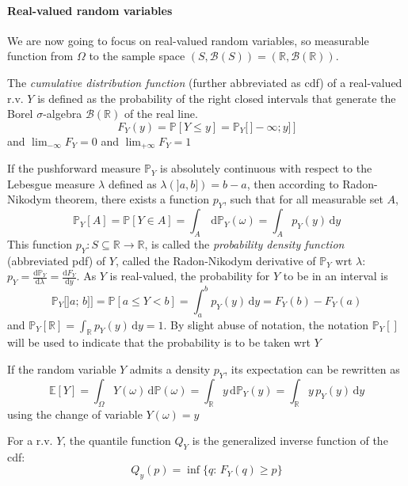 \documentclass[a4paper,11pt]{article}
\newcommand{\Ex}{\mathbb{E}}
\newcommand{\Prob}{\mathbb{P}}
\theoremstyle{defi}
\numberwithin{thmCounter}{section}
\begin{document}
\paragraph{Real-valued random variables}
We are now going to focus on real-valued random variables, so measurable function from $\Omega$ to the sample space $(S,\mathcal{B}(S)) = (\mathbb{R},\mathcal{B}(\mathbb{R}))$.
\begin{definition}
  \label{def:distribution}
  The \emph{cumulative distribution function} (further abbreviated as cdf) of a real-valued r.v. $Y$ is defined as the probability of the right closed intervals that generate the Borel $\sigma$-algebra $\mathcal{B}(\mathbb{R})$ of the real line.
  \begin{equation*}
    F_{Y}(y) = \Prob\left[Y \leq y\right] = \Prob_Y\big[\,]-\infty; y]\, \big]
  \end{equation*}
and $\lim_{-\infty}F_Y = 0$ and $\lim_{+\infty} F_Y = 1$
  
  If the pushforward measure $\Prob_Y$ is absolutely continuous with respect to the Lebesgue measure $\lambda$ defined as $\lambda\left(]a, b]\right) = b-a$, then according to Radon-Nikodym theorem, there exists a function $p_Y$, such that for all measurable set $A$,
  \begin{equation*}
    \Prob_Y[A] = \Prob[Y \in A] = \int_A \,\mathrm{d}\Prob_Y(\omega) = \int_A p_Y(y)\,\mathrm{d}y
  \end{equation*}
  This function $p_Y: S\subseteq\mathbb{R} \rightarrow \mathbb{R}$, is called the \emph{probability density function} (abbreviated pdf) of $Y$,  called the Radon-Nikodym derivative of $\Prob_Y$ wrt $\lambda$: $p_Y=\frac{\mathrm{d}\Prob_Y}{\mathrm{d} \lambda} = \frac{\mathrm{d} F_Y}{\mathrm{d} y}$.
  As $Y$ is real-valued, the probability for $Y$ to be in an interval is
  \begin{equation*}
    \Prob_Y\big[]a;\,b]\big]=\Prob[a \leq Y < b] = \int_{a}^b p_Y(y)\,\mathrm{d}y = F_Y(b) - F_Y(a)
  \end{equation*}
  and $\Prob_Y[\mathbb{R}] = \int_{\mathbb{R}}p_Y(y)\,\mathrm{d}y=1$. By slight abuse of notation, the notation $\Prob_Y\left[\right]$ will be used to indicate that the probability is to be taken wrt $Y$
\end{definition}
\begin{remark}
  If the random variable $Y$ admits a density $p_Y$, its expectation can be rewritten as
  \begin{equation*}
    \Ex\left[Y\right] = \int_{\Omega} Y(\omega) \,\mathrm{d}\Prob(\omega) = \int_{\mathbb{R}} y \,\mathrm{d}\Prob_{Y}(y) = \int_{\mathbb{R}} y\,p_Y(y)\,\mathrm{d}y
  \end{equation*}
  using the change of variable $Y(\omega) = y$
\end{remark}
\begin{definition}
  For a r.v. $Y$, the quantile function $Q_Y$ is the generalized inverse function of the cdf:
  \begin{equation*}
    Q_y(p) = \inf\{q:\, F_Y(q)\geq p\}
  \end{equation*}
\end{definition}
\end{document}
